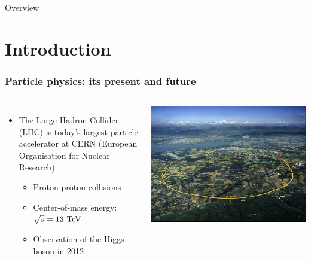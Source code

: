 
\begin{frame}{Overview}{}
\tableofcontents
\end{frame}


\section{Introduction}
\begin{frame}
  \frametitle{}
  \tableofcontents[currentsection]
\end{frame}
\begin{frame}
  \frametitle{Particle physics: its present and future}

  \begin{columns}
    \begin{itemize}
    \item The Large Hadron Collider (LHC) is today's largest particle
      accelerator at CERN (European Organisation for Nuclear Research)
      \begin{itemize}
      \item Proton-proton collisions
      \item Center-of-mass energy: $\sqrt{s}=13\,\mathrm{\,Te\kern -0.1em V}$
      \item Observation of the Higgs boson in 2012
      \end{itemize}
    \end{itemize}
    \centering
    \includegraphics[width=\textwidth]{figures/LHC.jpg}
  \end{columns}


\end{frame}
